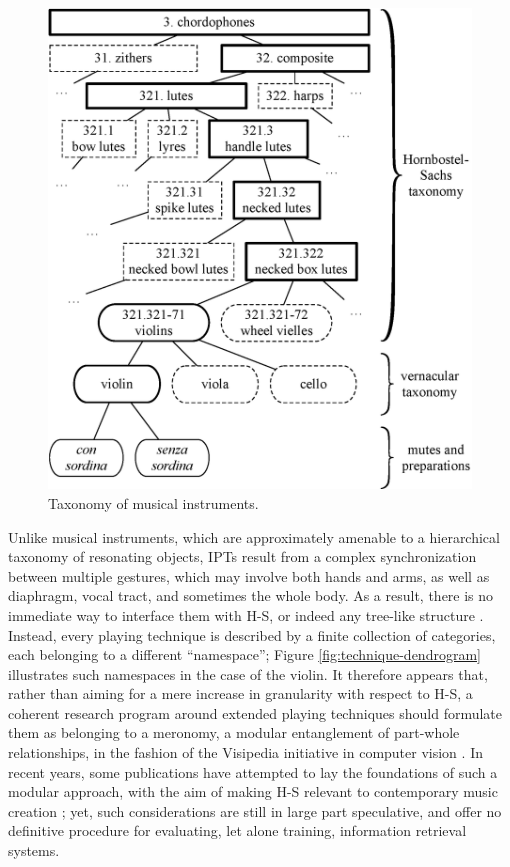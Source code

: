 \begin{figure}[t!]
\centering
\includegraphics[width=\linewidth]{./figs/dendrograms/instrument-dendrogram.eps}
\caption{Taxonomy of musical instruments.}
\label{fig:instrument-dendrogram}
\end{figure}

Unlike musical instruments, which are approximately amenable to a hierarchical taxonomy of resonating objects, IPTs result from a complex synchronization between multiple gestures, which may involve both hands and arms, as well as diaphragm, vocal tract, and sometimes the whole body.
As a result, there is no immediate way to interface them with H-S, or indeed any tree-like structure \cite{kolozali2011ismir}.
Instead, every playing technique is described by a finite collection of categories, each belonging to a different ``name\-space''; Figure \ref{fig:technique-dendrogram} illustrates such namespaces in the case of the violin.
It therefore appears that, rather than aiming for a mere increase in granularity with respect to H-S, a coherent research program around extended playing techniques should formulate them as belonging to a meronomy, \ie{} a modular entanglement of part-whole relationships, in the fashion of the Visipedia initiative in computer vision \cite{belongie2015pattern}.
In recent years, some publications have attempted to lay the foundations of such a modular approach, with the aim of making H-S relevant to contemporary music creation \cite{magnusson2017jnmr,weisser2011ytm}; yet, such considerations are still in large part speculative, and offer no definitive procedure for evaluating, let alone training, information retrieval systems.

